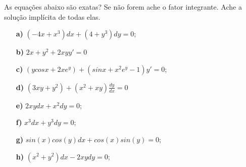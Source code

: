 \linespread{1.5}
As equações abaixo são exatas? Se não forem ache o fator integrante. Ache a solução implícita de todas elas.
\begin{itemize}
    \item[\textbf{a)}] $(-4x + x^3)dx + (4 + y^3)dy = 0$;
    \item[\textbf{b)}] $2x + y^2 + 2xyy' = 0$
    \item[\textbf{c)}] $(ycosx + 2xe^y) + (sinx + x^2e^y - 1)y' = 0$;
    \item[\textbf{d)}] $(3xy + y^2) + (x^2+xy)\frac{dy}{dx} = 0$
    \item[\textbf{e)}] $2xydx + x^2dy = 0$;
    \item[\textbf{f)}] $x^3dx + y^3dy = 0$;
    \item[\textbf{g)}] $sin(x)cos(y)dx + cos(x)sin(y) = 0$;
    \item[\textbf{h)}] $(x^2+y^2)dx - 2xydy = 0$;
\end{itemize}